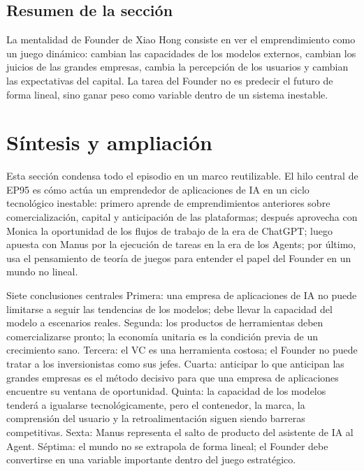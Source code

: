 \documentclass[a4paper]{article}
\begin{document}
\subsection{Resumen de la sección}

La mentalidad de Founder de Xiao Hong consiste en ver el emprendimiento como un juego dinámico: cambian las capacidades de los modelos externos, cambian los juicios de las grandes empresas, cambia la percepción de los usuarios y cambian las expectativas del capital. La tarea del Founder no es predecir el futuro de forma lineal, sino ganar peso como variable dentro de un sistema inestable.
\section{Síntesis y ampliación}

Esta sección condensa todo el episodio en un marco reutilizable. El hilo central de EP95 es cómo actúa un emprendedor de aplicaciones de IA en un ciclo tecnológico inestable: primero aprende de emprendimientos anteriores sobre comercialización, capital y anticipación de las plataformas; después aprovecha con Monica la oportunidad de los flujos de trabajo de la era de ChatGPT; luego apuesta con Manus por la ejecución de tareas en la era de los Agents; por último, usa el pensamiento de teoría de juegos para entender el papel del Founder en un mundo no lineal.

\begin{importantbox}{Siete conclusiones centrales}
Primera: una empresa de aplicaciones de IA no puede limitarse a seguir las tendencias de los modelos; debe llevar la capacidad del modelo a escenarios reales. Segunda: los productos de herramientas deben comercializarse pronto; la economía unitaria es la condición previa de un crecimiento sano. Tercera: el VC es una herramienta costosa; el Founder no puede tratar a los inversionistas como sus jefes. Cuarta: anticipar lo que anticipan las grandes empresas es el método decisivo para que una empresa de aplicaciones encuentre su ventana de oportunidad. Quinta: la capacidad de los modelos tenderá a igualarse tecnológicamente, pero el contenedor, la marca, la comprensión del usuario y la retroalimentación siguen siendo barreras competitivas. Sexta: Manus representa el salto de producto del asistente de IA al Agent. Séptima: el mundo no se extrapola de forma lineal; el Founder debe convertirse en una variable importante dentro del juego estratégico.
\end{importantbox}
\end{document}
